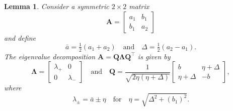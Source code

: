 \documentclass[12pt,a4paper]{article}
\newtheorem{lemma}[theorem]{Lemma}
\newcommand{\bs}[1]{\boldsymbol{#1}}
\begin{document}
\begin{lemma}
Consider a symmetric $2\times2$ matrix
\[
\bs{A}=\begin{bmatrix}a_1&b_1\\ b_1&a_2 \end{bmatrix}
\]
and define
\[
\bar a=\tfrac12(a_1+a_2)\quad\text{and}\quad \Delta=\tfrac12(a_2-a_1).
\]
The eigenvalue decomposition $\bs{A}=\bs{Q}\bs{\Lambda}\bs{Q}^\top$ is given by
\[
\bs{\Lambda}=\begin{bmatrix}\lambda_+& 0\\ 0&\lambda_- \end{bmatrix}
\quad\text{and}\quad
\bs{Q}=\frac{1}{\sqrt{2\eta(\eta+\Delta)}}
	\begin{bmatrix}b&\eta+\Delta\\ \eta+\Delta&-b\end{bmatrix},
\]
where
\[
\lambda_\pm=\bar a\pm\eta\quad\text{for}\quad
\eta=\sqrt{\Delta^2+(b_1)^2}.
\]
\end{lemma}
\end{document}
